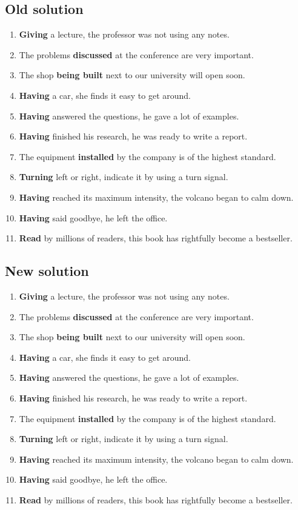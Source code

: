 \subsection*{Old solution}
\begin{enumerate}
      \item \textbf{Giving} a lecture, the professor was not using any notes.
      \item The problems \textbf{discussed} at the conference are very important.
      \item The shop \textbf{being built} next to our university will open soon.
      \item \textbf{Having} a car, she finds it easy to get around.
      \item \textbf{Having} answered the questions, he gave a lot of examples.
      \item \textbf{Having} finished his research, he was ready to write a report.
      \item The equipment \textbf{installed} by the company is of the highest standard.
      \item \textbf{Turning} left or right, indicate it by using a turn signal.
      \item \textbf{Having} reached its maximum intensity, the volcano began to calm down.
      \item \textbf{Having} said goodbye, he left the office.
      \item \textbf{Read} by millions of readers, this book has rightfully become a bestseller.
\end{enumerate}

\subsection*{New solution}
\begin{enumerate}
      \item \textbf{Giving} a lecture, the professor was not using any notes.
      \item The problems \textbf{discussed} at the conference are very important.
      \item The shop \textbf{being built} next to our university will open soon.
      \item \textbf{Having} a car, she finds it easy to get around.
      \item \textbf{Having} answered the questions, he gave a lot of examples.
      \item \textbf{Having} finished his research, he was ready to write a report.
      \item The equipment \textbf{installed} by the company is of the highest standard.
      \item \textbf{Turning} left or right, indicate it by using a turn signal.
      \item \textbf{Having} reached its maximum intensity, the volcano began to calm down.
      \item \textbf{Having} said goodbye, he left the office.
      \item \textbf{Read} by millions of readers, this book has rightfully become a bestseller.
\end{enumerate}

